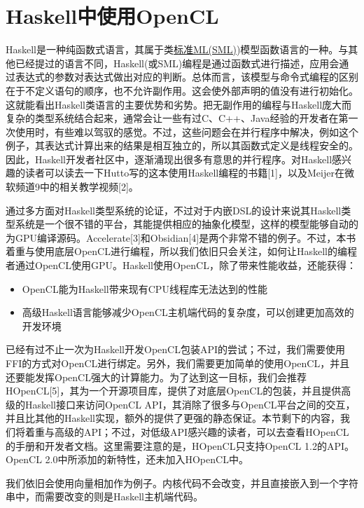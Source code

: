 \section{Haskell中使用OpenCL}

Haskell是一种纯函数式语言，其属于类\href{https://en.wikipedia.org/wiki/ML\_(programming\_language}{标准ML(SML)})模型函数语言的一种。与其他已经提过的语言不同，Haskell(或SML)编程是通过函数式进行描述，应用会通过表达式的参数对表达式做出对应的判断。总体而言，该模型与命令式编程的区别在于不定义语句的顺序，也不允许副作用。这会使外部声明的值没有进行初始化。这就能看出Haskell类语言的主要优势和劣势。把无副作用的编程与Haskell庞大而复杂的类型系统结合起来，通常会让一些有过C、C++、Java经验的开发者在第一次使用时，有些难以驾驭的感觉。不过，这些问题会在并行程序中解决，例如这个例子，其表达式计算出来的结果是相互独立的，所以其函数式定义是线程安全的。因此，Haskell开发者社区中，逐渐涌现出很多有意思的并行程序。对Haskell感兴趣的读者可以读去一下Hutto写的这本使用Haskell编程的书籍[1]，以及Meijer在微软频道9中的相关教学视频[2]。

通过多方面对Haskell类型系统的论证，不过对于内嵌DSL的设计来说其Haskell类型系统是一个很不错的平台，其能提供相应的抽象化模型，这样的模型能够自动的为GPU编译源码。Accelerate[3]和Obsidian[4]是两个非常不错的例子。不过，本书着重与使用底层OpenCL进行编程，所以我们依旧只会关注，如何让Haskell的编程者通过OpenCL使用GPU。Haskell使用OpenCL，除了带来性能收益，还能获得：

\begin{itemize}
\item OpenCL能为Haskell带来现有CPU线程库无法达到的性能
\item 高级Haskell语言能够减少OpenCL主机端代码的复杂度，可以创建更加高效的开发环境
\end{itemize}

已经有过不止一次为Haskell开发OpenCL包装API的尝试；不过，我们需要使用FFI的方式对OpenCL进行绑定。另外，我们需要更加简单的使用OpenCL，并且还要能发挥OpenCL强大的计算能力。为了达到这一目标，我们会推荐HOpenCL[5]，其为一个开源项目库，提供了对底层OpenCL的包装，并且提供高级的Haskell接口来访问OpenCL API，其消除了很多与OpenCL平台之间的交互，并且比其他的Haskell实现，额外的提供了更强的静态保证。本节剩下的内容，我们将着重与高级的API；不过，对低级API感兴趣的读者，可以去查看HOpenCL的手册和开发者文档。这里需要注意的是，HOpenCL只支持OpenCL 1.2的API。OpenCL 2.0中所添加的新特性，还未加入HOpenCL中。

我们依旧会使用向量相加作为例子。内核代码不会改变，并且直接嵌入到一个字符串中，而需要改变的则是Haskell主机端代码。

